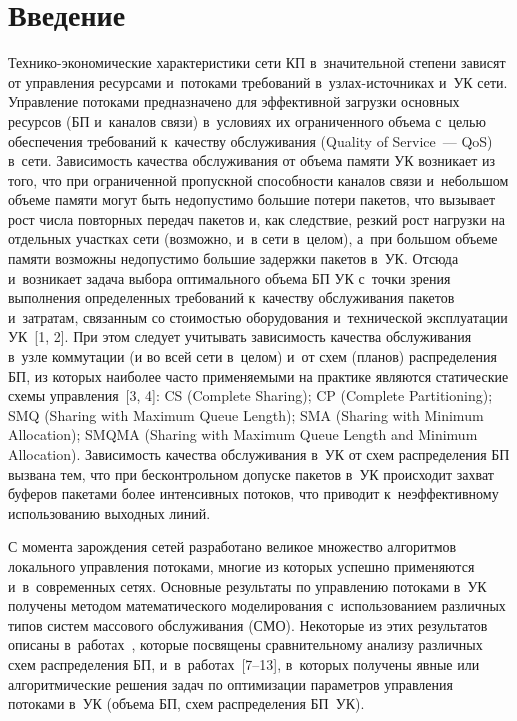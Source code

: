 
\thispagestyle{headings}

\begin{multicols}{2}

\label{st\stat}

\section{Введение}

  Технико-экономические характеристики сети КП
в~значительной степени зависят от управления ресурсами и~потоками 
требований в~уз\-лах-ис\-точ\-ни\-ках и~УК сети. 
Управление потоками предназначено для эффективной загрузки основных 
ресурсов (БП и~каналов связи) в~условиях их ограниченного 
объема с~целью обеспечения требований к~качеству обслуживания (Quality of 
Service~--- QoS) в~сети. Зависимость качества обслуживания от объема памяти 
УК возникает из того, что при ограниченной пропускной способности каналов 
связи и~небольшом объеме памяти могут быть недопустимо большие потери 
пакетов, что вызывает рост числа повторных передач пакетов и, как следствие, 
резкий рост нагрузки на отдельных участках сети (возможно, и~в сети в~целом), 
а~при большом объеме памяти возможны недопустимо большие задержки 
пакетов в~УК. Отсюда и~возникает задача выбора оптимального объема БП УК с~точки зрения выполнения определенных требований к~качеству обслуживания 
пакетов и~затратам, связанным со стоимостью оборудования и~технической 
эксплуатации УК~[1, 2]. При этом следует учитывать зависимость качества 
обслуживания в~узле коммутации (и во всей сети в~целом) и~от схем (планов) 
распределения БП, из которых наиболее часто применяемыми на практике 
являются статические схемы управления~[3, 4]: CS (Complete Sharing); CP 
(Complete Partitioning); SMQ (Sharing with Maximum Queue Length); SMA 
(Sharing with Minimum Allocation); SMQMA (Sharing with Maximum Queue 
Length and Minimum Allocation). Зависимость качества обслуживания в~УК от 
схем распределения БП вызвана тем, что при бесконтрольном допуске пакетов 
в~УК происходит захват буферов пакетами более интенсивных потоков, что 
приводит к~неэффективному использованию выходных линий. 
  
  С момента зарождения сетей разработано великое множество алгоритмов 
локального управления потоками, многие из которых успешно применяются 
и~в~современных сетях. Основные результаты по управлению потоками в~УК 
получены методом математического моделирования с~использованием 
различных типов систем массового обслуживания (СМО). Некоторые из этих 
результатов описаны в~работах~\cite{4-ag, 5-ag, 6-ag}, которые посвящены 
сравнительному анализу различных схем распределения БП, 
и~в~работах~[7--13], в~которых получены явные или алгоритмические решения 
задач по оптимизации параметров управления потоками в~УК (объема БП, схем 
распределения БП~УК). 
  

\end{multicols}
